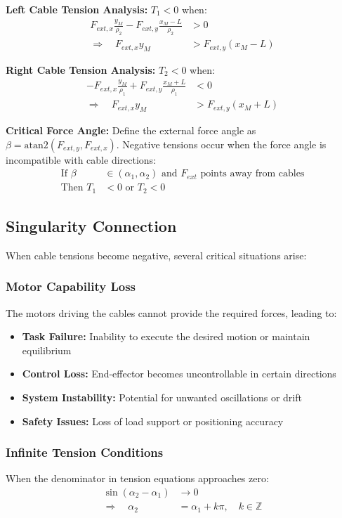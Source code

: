 \textbf{Left Cable Tension Analysis:}
$T_1 < 0$ when:
\begin{align}
F_{ext,x} \frac{y_M}{\rho_2} - F_{ext,y} \frac{x_M - L}{\rho_2} &> 0 \\
\Rightarrow \quad F_{ext,x} y_M &> F_{ext,y} (x_M - L)
\end{align}

\textbf{Right Cable Tension Analysis:}
$T_2 < 0$ when:
\begin{align}
-F_{ext,x} \frac{y_M}{\rho_1} + F_{ext,y} \frac{x_M + L}{\rho_1} &< 0 \\
\Rightarrow \quad F_{ext,x} y_M &> F_{ext,y} (x_M + L)
\end{align}

\textbf{Critical Force Angle:}
Define the external force angle as $\beta = \text{atan2}(F_{ext,y}, F_{ext,x})$.
Negative tensions occur when the force angle is incompatible with cable directions:
\begin{align}
\text{If } \beta &\in (\alpha_1, \alpha_2) \text{ and } F_{ext} \text{ points away from cables} \\
\text{Then } T_1 &< 0 \text{ or } T_2 < 0
\end{align}

\subsection{Singularity Connection}
When cable tensions become negative, several critical situations arise:

\subsubsection{Motor Capability Loss}
The motors driving the cables cannot provide the required forces, leading to:
\begin{itemize}
    \item \textbf{Task Failure:} Inability to execute the desired motion or maintain equilibrium
    \item \textbf{Control Loss:} End-effector becomes uncontrollable in certain directions
    \item \textbf{System Instability:} Potential for unwanted oscillations or drift
    \item \textbf{Safety Issues:} Loss of load support or positioning accuracy
\end{itemize}

\subsubsection{Infinite Tension Conditions}
When the denominator in tension equations approaches zero:
\begin{align}
\sin(\alpha_2 - \alpha_1) &\to 0 \\
\Rightarrow \quad \alpha_2 &= \alpha_1 + k\pi, \quad k \in \mathbb{Z}
\end{align}

